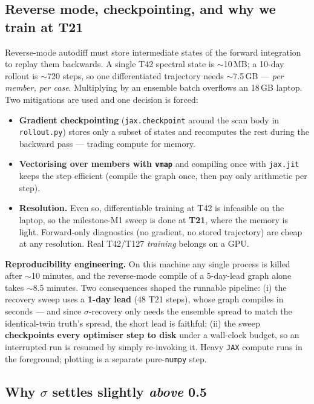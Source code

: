 \documentclass[11pt]{article}
\newcommand{\code}[1]{\texttt{#1}}
\begin{document}
\subsection{Reverse mode, checkpointing, and why we train at T21}
\label{sec:memory}\label{sec:hardware}

Reverse-mode autodiff must store intermediate states of the forward integration
to replay them backwards. A single T42 spectral state is $\sim$10\,MB; a 10-day
rollout is $\sim$720 steps, so one differentiated trajectory needs $\sim$7.5\,GB
--- \emph{per member, per case}. Multiplying by an ensemble batch overflows an
18\,GB laptop. Two mitigations are used and one decision is forced:
\begin{itemize}
\item \textbf{Gradient checkpointing} (\code{jax.checkpoint} around the scan body
  in \code{rollout.py}) stores only a subset of states and recomputes the rest
  during the backward pass --- trading compute for memory.
\item \textbf{Vectorising over members with \code{vmap}} and compiling once with
  \code{jax.jit} keeps the step efficient (compile the graph once, then pay only
  arithmetic per step).
\item \textbf{Resolution.} Even so, differentiable training at T42 is infeasible
  on the laptop, so the milestone-M1 sweep is done at \textbf{T21}, where the
  memory is light. Forward-only diagnostics (no gradient, no stored trajectory)
  are cheap at any resolution. Real T42/T127 \emph{training} belongs on a GPU.
\end{itemize}

\begin{keybox}
\textbf{Reproducibility engineering.} On this machine any single process is
killed after $\sim$10 minutes, and the reverse-mode compile of a 5-day-lead graph
alone takes $\sim$8.5 minutes. Two consequences shaped the runnable pipeline:
(i) the recovery sweep uses a \textbf{1-day lead} (48 T21 steps), whose graph
compiles in seconds --- and since $\sigma$-recovery only needs the ensemble spread
to match the identical-twin truth's spread, the short lead is faithful; (ii) the
sweep \textbf{checkpoints every optimiser step to disk} under a wall-clock budget,
so an interrupted run is resumed by simply re-invoking it. Heavy \code{JAX}
compute runs in the foreground; plotting is a separate pure-\code{numpy} step.
\end{keybox}

\subsection{Why $\sigma$ settles slightly \emph{above} 0.5}\label{sec:whybias}
\end{document}
